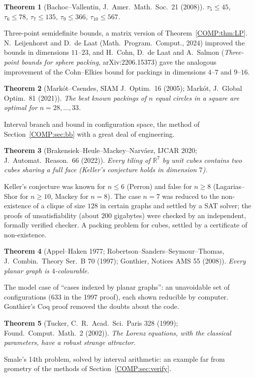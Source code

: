 \documentclass[11pt,openany]{book}
\theoremstyle{plain}
\newtheorem{theorem}{Theorem}[chapter]
\theoremstyle{definition}
\theoremstyle{remark}
\newcommand{\R}{\mathbb{R}}
\newcommand{\kiss}{\tau}               %
\begin{document}
\begin{theorem}[Bachoc--Vallentin, J.\ Amer.\ Math.\ Soc.\ 21 (2008)]
$\kiss_5\le45$, $\kiss_6\le78$, $\kiss_7\le135$, $\kiss_9\le366$, $\kiss_{10}\le567$.
\end{theorem}
\noindent Three-point semidefinite bounds, a matrix version of Theorem~\ref{COMP:thm:LP}. N.~Leijenhorst and
D.~de Laat (Math.\ Program.\ Comput., 2024) improved the bounds in dimensions $11$--$23$, and
H.~Cohn, D.~de Laat and A.~Salmon (\emph{Three-point bounds for sphere packing}, arXiv:2206.15373) gave the
analogous improvement of the Cohn--Elkies bound for packings in dimensions $4$--$7$ and $9$--$16$.

\begin{theorem}[Mark\'ot--Csendes, SIAM J.\ Optim.\ 16 (2005); Mark\'ot, J.\ Global Optim.\ 81 (2021)]
The best known packings of $n$ equal circles in a square are optimal for $n=28,\dots,33$.
\end{theorem}
\noindent Interval branch and bound in configuration space, the method of Section~\ref{COMP:sec:bb} with a
great deal of engineering.

\begin{theorem}[Brakensiek--Heule--Mackey--Narv\'aez, IJCAR 2020; J.\ Automat.\ Reason.\ 66 (2022)]
Every tiling of $\R^7$ by unit cubes contains two cubes sharing a full face (Keller's conjecture holds in
dimension $7$).
\end{theorem}
\noindent Keller's conjecture was known for $n\le6$ (Perron) and false for $n\ge8$ (Lagarias--Shor for $n\ge10$, Mackey
for $n=8$). The case $n=7$ was reduced to the non-existence of a clique of size $128$ in certain graphs and settled by
a SAT solver; the proofs of unsatisfiability (about $200$ gigabytes) were checked by an independent, formally
verified checker. A packing problem for cubes, settled by a certificate of non-existence.

\begin{theorem}[Appel--Haken 1977; Robertson--Sanders--Seymour--Thomas, J.\ Combin.\ Theory Ser.~B 70 (1997); Gonthier, Notices AMS 55 (2008)]
Every planar graph is $4$-colourable.
\end{theorem}
\noindent The model case of ``cases indexed by planar graphs'': an unavoidable set of configurations ($633$ in the
1997 proof), each shown reducible by computer. Gonthier's Coq proof removed the doubts about the code.

\begin{theorem}[Tucker, C.~R.\ Acad.\ Sci.\ Paris 328 (1999); Found.\ Comput.\ Math.\ 2 (2002)]
The Lorenz equations, with the classical parameters, have a robust strange attractor.
\end{theorem}
\noindent Smale's 14th problem, solved by interval arithmetic: an example far from geometry of the methods of
Section~\ref{COMP:sec:verify}.
\end{document}
